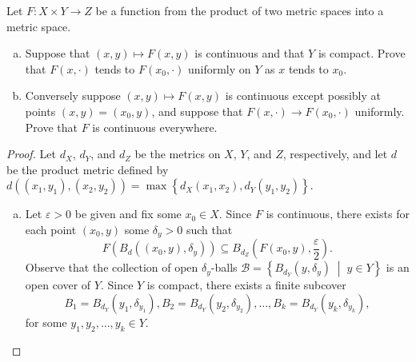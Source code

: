 \documentclass[12pt]{amsart}
\begin{document}
\begin{setup}
  Let $F \colon X \times Y \rightarrow Z$ be a function from the product of two metric spaces into a metric space.
  \begin{enumerate}[(a)]
  \item
    Suppose that $(x,y) \mapsto F(x,y)$ is continuous and that $Y$ is compact.
    Prove that $F(x,\cdot)$ tends to $F(x_0, \cdot)$ uniformly on $Y$ as $x$ tends to $x_0$.
  \item
    Conversely suppose $(x,y) \mapsto F(x,y)$ is continuous except possibly at points $(x,y) = (x_0, y)$, and suppose that $F(x, \cdot) \rightarrow F(x_0, \cdot)$ uniformly.
    Prove that $F$ is continuous everywhere.
  \end{enumerate}
  \begin{proof}
    Let $d_X$, $d_Y$, and $d_Z$ be the metrics on $X$, $Y$, and $Z$, respectively, and let $d$ be the product metric defined by $d((x_1,y_1), (x_2,y_2)) = \max \left\{d_X(x_1, x_2), d_Y(y_1, y_2)\right\}$.
    \begin{enumerate}[(a)]
    \item
      Let $\varepsilon > 0$ be given and fix some $x_0 \in X$.
      Since $F$ is continuous, there exists for each point $(x_0, y)$ some $\delta_y > 0$ such that 
      \begin{equation}\label{18.1}
        F\left(B_d \left( \left(x_0,y\right), \delta_y\right)\right)\subseteq B_{d_Z}\left(F \left(x_0, y\right), \frac{\varepsilon}{2}\right).
      \end{equation}
      Observe that the collection of open $\delta_y$-balls $\mathcal{B} = \left\{B_{d_Y}(y, \delta_y) \;\middle\vert\; y \in Y\right\}$ is an open cover of $Y$.
      Since $Y$ is compact, there exists a finite subcover 
      $$B_1 = B_{d_Y}\left(y_1, \delta_{y_1}\right), B_2 = B_{d_Y}\left(y_2, \delta_{y_2}\right), \ldots, B_k = B_{d_Y}\left(y_k, \delta_{y_k}\right),$$ 
      for some $y_1, y_2, \ldots, y_k \in Y$.


\end{enumerate}
\end{proof}
\end{setup}
\end{document}

